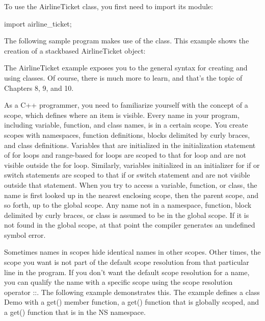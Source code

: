 
To use the AirlineTicket class, you first need to import its module:

\begin{cpp}
import airline_ticket;
\end{cpp}

The following sample program makes use of the class. This example shows the creation of a stackbased AirlineTicket object:


The AirlineTicket example exposes you to the general syntax for creating and using classes. Of course, there is much more to learn, and that’s the topic of Chapters 8, 9, and 10.


As a C++ programmer, you need to familiarize yourself with the concept of a scope, which defines where an item is visible. Every name in your program, including variable, function, and class names, is in a certain scope. You create scopes with namespaces, function definitions, blocks delimited by curly braces, and class definitions. Variables that are initialized in the initialization statement of for loops and range-based for loops are scoped to that for loop and are not visible outside the for loop. Similarly, variables initialized in an initializer for if or switch statements are scoped to that if or switch statement and are not visible outside that statement. When you try to access a variable, function, or class, the name is first looked up in the nearest enclosing scope, then the parent scope, and so forth, up to the global scope. Any name not in a namespace, function, block delimited by curly braces, or class is assumed to be in the global scope. If it is not found in the global scope, at that point the compiler generates an undefined symbol error.

Sometimes names in scopes hide identical names in other scopes. Other times, the scope you want is not part of the default scope resolution from that particular line in the program. If you don’t want the default scope resolution for a name, you can qualify the name with a specific scope using the scope resolution operator ::. The following example demonstrates this. The example defines a class Demo with a get() member function, a get() function that is globally scoped, and a get() function that is in the NS namespace.

